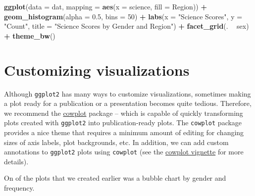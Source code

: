 \documentclass[]{book}
\newenvironment{Shaded}{\begin{snugshade}}{\end{snugshade}}
\newcommand{\DataTypeTok}[1]{\textcolor[rgb]{0.13,0.29,0.53}{#1}}
\newcommand{\DecValTok}[1]{\textcolor[rgb]{0.00,0.00,0.81}{#1}}
\newcommand{\FloatTok}[1]{\textcolor[rgb]{0.00,0.00,0.81}{#1}}
\newcommand{\KeywordTok}[1]{\textcolor[rgb]{0.13,0.29,0.53}{\textbf{#1}}}
\newcommand{\NormalTok}[1]{#1}
\newcommand{\OperatorTok}[1]{\textcolor[rgb]{0.81,0.36,0.00}{\textbf{#1}}}
\newcommand{\StringTok}[1]{\textcolor[rgb]{0.31,0.60,0.02}{#1}}
\begin{document}
\begin{Shaded}
\begin{Highlighting}[]
\KeywordTok{ggplot}\NormalTok{(}\DataTypeTok{data =}\NormalTok{ dat,}
       \DataTypeTok{mapping =} \KeywordTok{aes}\NormalTok{(}\DataTypeTok{x =}\NormalTok{ science, }\DataTypeTok{fill =}\NormalTok{ Region)) }\OperatorTok{+}
\StringTok{  }\KeywordTok{geom_histogram}\NormalTok{(}\DataTypeTok{alpha =} \FloatTok{0.5}\NormalTok{, }\DataTypeTok{bins =} \DecValTok{50}\NormalTok{) }\OperatorTok{+}
\StringTok{  }\KeywordTok{labs}\NormalTok{(}\DataTypeTok{x =} \StringTok{"Science Scores"}\NormalTok{, }\DataTypeTok{y =} \StringTok{"Count"}\NormalTok{,}
       \DataTypeTok{title =} \StringTok{"Science Scores by Gender and Region"}\NormalTok{) }\OperatorTok{+}
\StringTok{  }\KeywordTok{facet_grid}\NormalTok{(. }\OperatorTok{~}\StringTok{ }\NormalTok{sex) }\OperatorTok{+}
\StringTok{  }\KeywordTok{theme_bw}\NormalTok{()}
\end{Highlighting}
\end{Shaded}

\hypertarget{customizing-visualizations}{%
\section{Customizing visualizations}\label{customizing-visualizations}}

Although \texttt{ggplot2} has many ways to customize visualizations, sometimes making a plot ready for a publication or a presentation becomes quite tedious. Therefore, we recommend the \href{https://cran.r-project.org/web/packages/cowplot/index.html}{cowplot} package -- which is capable of quickly transforming plots created with \texttt{ggplot2} into publication-ready plots. The \texttt{cowplot} package provides a nice theme that requires a minimum amount of editing for changing sizes of axis labels, plot backgrounds, etc. In addition, we can add custom annotations to \texttt{ggplot2} plots using \texttt{cowplot} (see the \href{https://cran.r-project.org/web/packages/cowplot/vignettes/introduction.html}{cowplot vignette} for more details).

On of the plots that we created earlier was a bubble chart by gender and frequency.
\end{document}
